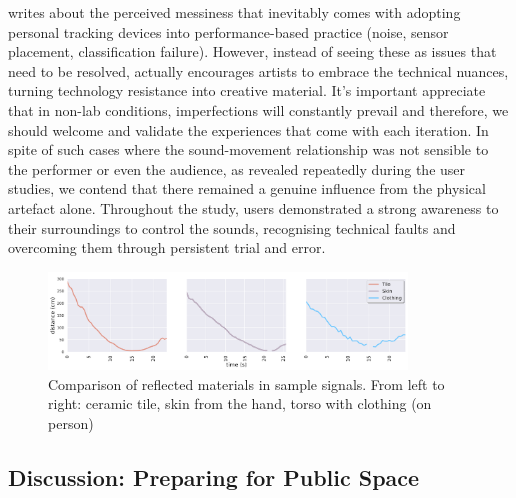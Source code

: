 \citeauthor{fdili_alaoui_making_2019} \citeyear{fdili_alaoui_making_2019} writes about the perceived messiness that inevitably comes with adopting personal tracking devices into performance-based practice (noise, sensor placement, classification failure). However, instead of seeing these as issues that need to be resolved, actually encourages artists to embrace the technical nuances, turning technology resistance into creative material. It's important appreciate that in non-lab conditions, imperfections will constantly prevail and therefore, we should welcome and validate the experiences that come with each iteration. In spite of such cases where the sound-movement relationship was not sensible to the performer or even the audience, as revealed repeatedly during the user studies, we contend that there remained a genuine influence from the physical artefact alone. Throughout the study, users demonstrated a strong awareness to their surroundings to control the sounds, recognising technical faults and overcoming them through persistent trial and error.

\begin{figure}[!ht]
\centering
\includegraphics[width=0.85\textwidth,keepaspectratio]{Chapters/Figures/adse_ess/figure5_all_materials_v2.png}
{\caption[Comparison of reflected materials in sample signals]{Comparison of reflected materials in sample signals. From left to right: ceramic tile, skin from the hand, torso with clothing (on person)}\label{fig:material_comparison}}
\end{figure}

\subsection{Discussion: Preparing for Public Space}
\label{sec5:discussion}

